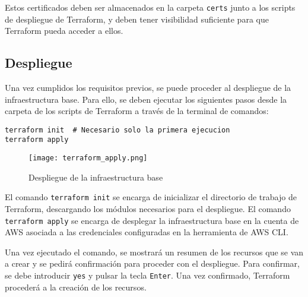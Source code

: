 Estos certificados deben ser almacenados en la carpeta \texttt{certs} junto a
los scripts de despliegue de Terraform, y deben tener visibilidad suficiente
para que Terraform pueda acceder a ellos.


\subsection{Despliegue}
Una vez cumplidos los requisitos previos, se puede proceder al despliegue de
la infraestructura base. Para ello, se deben ejecutar los siguientes pasos desde
la carpeta de los scripts de Terraform a través de la terminal de comandos:

\begin{lstlisting}
terraform init  # Necesario solo la primera ejecucion
terraform apply
\end{lstlisting}

\begin{figure}[H]
	\centering
	\texttt{[image: terraform\_apply.png]}
	\caption{Despliegue de la infraestructura base}
	\label{fig:terraform_apply}
\end{figure}

El comando \texttt{terraform init} se encarga de inicializar el directorio de
trabajo de Terraform, descargando los módulos necesarios para el despliegue.
El comando \texttt{terraform apply} se encarga de desplegar la infraestructura
base en la cuenta de AWS asociada a las credenciales configuradas en la
herramienta de AWS CLI.

Una vez ejecutado el comando, se mostrará un resumen de los recursos que se
van a crear y se pedirá confirmación para proceder con el despliegue. Para
confirmar, se debe introducir \texttt{yes} y pulsar la tecla \texttt{Enter}.
Una vez confirmado, Terraform procederá a la creación de los recursos.
